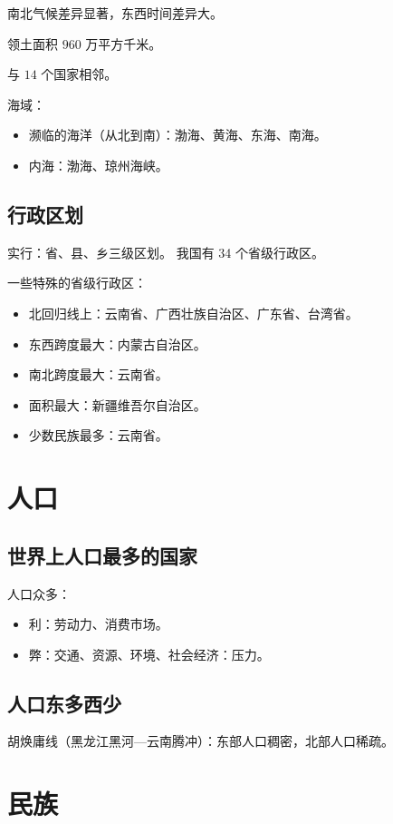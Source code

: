 \documentclass[b5paper,10pt]{book}
\begin{document}
南北气候差异显著，东西时间差异大。

领土面积 $960$ 万平方千米。

与 $14$ 个国家相邻。

海域：
\begin{itemize}
	\item 濒临的海洋（从北到南）：渤海、黄海、东海、南海。
	\item 内海：渤海、琼州海峡。
\end{itemize}

\subsection{行政区划}

实行：省、县、乡三级区划。
我国有 34 个省级行政区。

一些特殊的省级行政区：
\begin{itemize}
	\item 北回归线上：云南省、广西壮族自治区、广东省、台湾省。
	\item 东西跨度最大：内蒙古自治区。
	\item 南北跨度最大：云南省。
	\item 面积最大：新疆维吾尔自治区。
	\item 少数民族最多：云南省。
\end{itemize}

\section{人口}
\subsection{世界上人口最多的国家}

人口众多：
\begin{itemize}
	\item 利：劳动力、消费市场。
	\item 弊：交通、资源、环境、社会经济：压力。
\end{itemize}

\subsection{人口东多西少}
胡焕庸线（黑龙江黑河—云南腾冲）：东部人口稠密，北部人口稀疏。

\section{民族}
\end{document}
